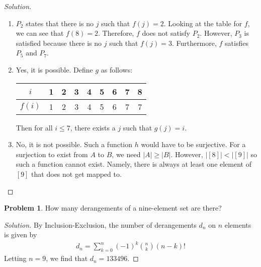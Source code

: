 \documentclass[12pt]{article}
\newcounter{chapternumber}
\theoremstyle{definition}
\newtheorem{problem-internal}{Problem}[chapternumber]
\newenvironment{problem}{
  \medskip
  \begin{problem-internal}
}{
\end{problem-internal}
}
\newenvironment{solution}{
  \begin{proof}[Solution]
    \vspace{-8px}
    \setlength{\parskip}{4px}
    \setlength{\parindent}{0px}
}{
\end{proof}
}
\begin{document}
  \begin{solution}
    \hfill
    \begin{enumerate}[label={\alph*.}]
      \item \(P_{2}\) states that there is no \(j\) such that \(f(j) = 2\). Looking at the table for \(f\), we can see that \(f(8) = 2\).
      Therefore, \(f\) does not satisfy \(P_{2}\).
      However, \(P_{3}\) is satisfied because there is no \(j\) such that \(f(j) = 3\). Furthermore, \(f\) satisfies \(P_{5}\) and \(P_{7}\).

      \item Yes, it is possible. Define \(g\) as follows:

      \begin{table}[H]
        \centering
        \begin{tabular}{c c c c c c c c c}
          \(i\) & 1 & 2 & 3 & 4 & 5 & 6 & 7 & 8 \\
          \hline
          \(f(i)\) & 1 & 2 & 3 & 4 & 5 & 6 & 7 & 7
        \end{tabular}
      \end{table}
      Then for all \(i \leq 7\), there exists a \(j\) such that \(g(j) = i\).

      \item No, it is not possible. Such a function \(h\) would have to be surjective. For a surjection to exist from \(A\) to \(B\), we need \(|A| \geq |B|\). However, \(|[8]| < |[9]|\) so such a function cannot exist. Namely, there is always at least one element of \([9]\) that does not get mapped to.
    \end{enumerate}
  \end{solution}


  \setcounter{problem-internal}{18}
  \begin{problem}
    How many derangements of a nine-element set are there?
  \end{problem}

  \begin{solution}
    By Inclusion-Exclusion, the number of derangements \(d_{n}\) on \(n\) elements is given by
    \begin{align*}
      d_{n} = \sum_{k = 0}^{n} (-1)^{k} {n \choose k} (n - k)!
    \end{align*}
    Letting \(n = 9\), we find that \(d_{n} = 133496\).
  \end{solution}
\end{document}
